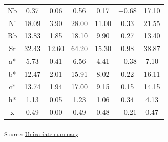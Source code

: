 \documentclass[
  number]{elsarticle}
\begin{document}
\begin{longtable}[]{@{}ccccccc@{}}
Nb & 0.37 & 0.06 & 0.56 & 0.17 & −0.68 & 17.10 \\
Ni & 18.09 & 3.90 & 28.00 & 11.00 & 0.33 & 21.55 \\
Rb & 13.83 & 1.85 & 18.10 & 9.90 & 0.27 & 13.40 \\
Sr & 32.43 & 12.60 & 64.20 & 15.30 & 0.98 & 38.87 \\
a* & 5.73 & 0.41 & 6.56 & 4.41 & −0.38 & 7.10 \\
b* & 12.47 & 2.01 & 15.91 & 8.02 & 0.22 & 16.11 \\
c* & 13.74 & 1.94 & 17.00 & 9.15 & 0.15 & 14.15 \\
h* & 1.13 & 0.05 & 1.23 & 1.06 & 0.34 & 4.13 \\
x & 0.49 & 0.00 & 0.49 & 0.48 & −0.21 & 0.47 \\

\end{longtable}

\textsubscript{Source:
\href{https://alex-koiter.github.io/terrain-attributes/notebooks/univariate_analysis.qmd.html\#cell-tbl-univariate-summary}{Univariate
summary}}
\end{document}
